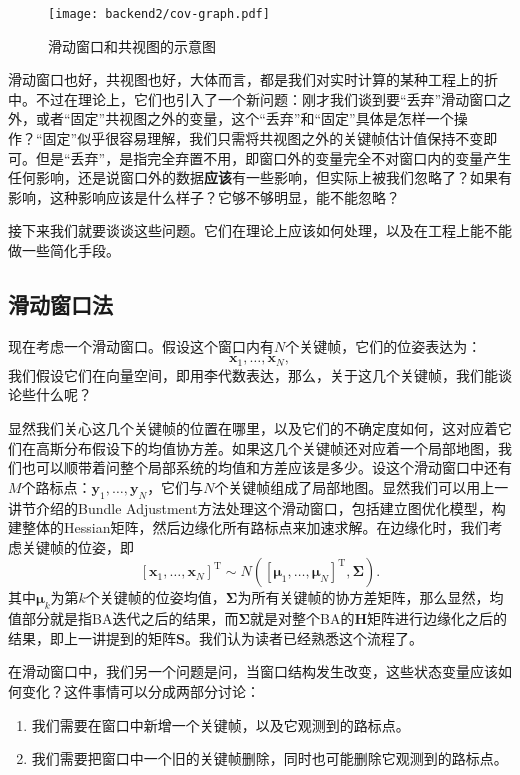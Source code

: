\begin{figure}[!ht]
	\centering
	\texttt{[image: backend2/cov-graph.pdf]}
	\caption{滑动窗口和共视图的示意图}
	\label{fig:cov-graph}
\end{figure}

滑动窗口也好，共视图也好，大体而言，都是我们对实时计算的某种工程上的折中。不过在理论上，它们也引入了一个新问题：刚才我们谈到要“丢弃”滑动窗口之外，或者“固定”共视图之外的变量，这个“丢弃”和“固定”具体是怎样一个操作？“固定”似乎很容易理解，我们只需将共视图之外的关键帧估计值保持不变即可。但是“丢弃”，是指完全弃置不用，即窗口外的变量完全不对窗口内的变量产生任何影响，还是说窗口外的数据\textbf{应该}有一些影响，但实际上被我们忽略了？如果有影响，这种影响应该是什么样子？它够不够明显，能不能忽略？

接下来我们就要谈谈这些问题。它们在理论上应该如何处理，以及在工程上能不能做一些简化手段。

\subsection{滑动窗口法}
现在考虑一个滑动窗口。假设这个窗口内有$N$个关键帧，它们的位姿表达为：$$\bm{x}_1, \ldots, \bm{x}_N,$$我们假设它们在向量空间，即用李代数表达，那么，关于这几个关键帧，我们能谈论些什么呢？

显然我们关心这几个关键帧的位置在哪里，以及它们的不确定度如何，这对应着它们在高斯分布假设下的均值协方差。如果这几个关键帧还对应着一个局部地图，我们也可以顺带着问整个局部系统的均值和方差应该是多少。设这个滑动窗口中还有$M$个路标点：$\bm{y}_1, \ldots, \bm{y}_N$，它们与$N$个关键帧组成了局部地图。显然我们可以用上一讲节介绍的Bundle Adjustment方法处理这个滑动窗口，包括建立图优化模型，构建整体的Hessian矩阵，然后边缘化所有路标点来加速求解。在边缘化时，我们考虑关键帧的位姿，即$$[\bm{x}_1, \ldots, \bm{x}_N]^\mathrm{T} \sim N([\boldsymbol{\mu}_1, \ldots, \boldsymbol{\mu}_N]^\mathrm{T},  \boldsymbol{\Sigma}).$$ 其中$\boldsymbol{\mu}_k$为第$k$个关键帧的位姿均值，$\boldsymbol{\Sigma}$为所有关键帧的协方差矩阵，那么显然，均值部分就是指BA迭代之后的结果，而$\boldsymbol{\Sigma}$就是对整个BA的$\bm{H}$矩阵进行边缘化之后的结果，即上一讲提到的矩阵$\bm{S}$。我们认为读者已经熟悉这个流程了。

在滑动窗口中，我们另一个问题是问，当窗口结构发生改变，这些状态变量应该如何变化？这件事情可以分成两部分讨论：
\begin{enumerate}
\item 我们需要在窗口中新增一个关键帧，以及它观测到的路标点。
\item 我们需要把窗口中一个旧的关键帧删除，同时也可能删除它观测到的路标点。	
\end{enumerate}

